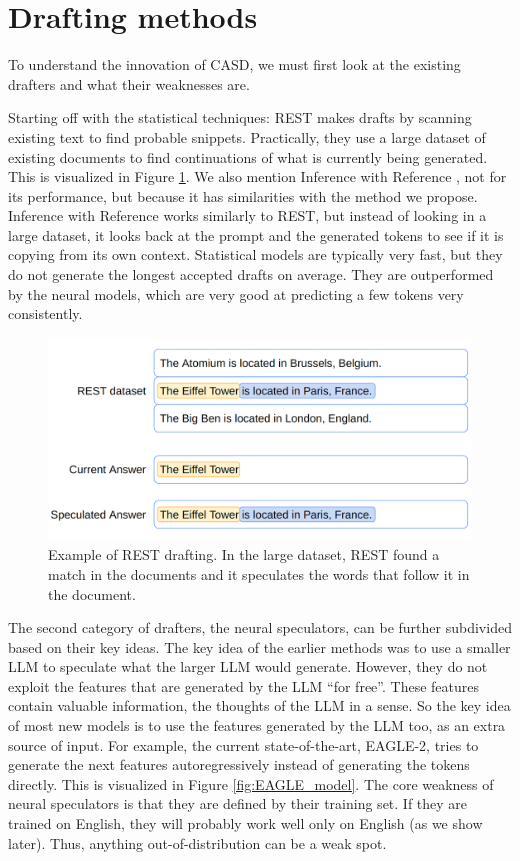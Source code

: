 \section{Drafting methods}
To understand the innovation of CASD, we must first look at the existing drafters and what their weaknesses are.

Starting off with the statistical techniques: REST \cite{he2023rest} makes drafts by scanning existing text to find probable snippets. Practically, they use a large dataset of existing documents to find continuations of what is currently being generated. This is visualized in Figure \ref{fig:spec_dec_rest}. We also mention Inference with Reference \cite{yang2023inference}, not for its performance, but because it has similarities with the method we propose. Inference with Reference works similarly to REST, but instead of looking in a large dataset, it looks back at the prompt and the generated tokens to see if it is copying from its own context. Statistical models are typically very fast, but they do not generate the longest accepted drafts on average. They are outperformed by the neural models, which are very good at predicting a few tokens very consistently. 

\begin{figure}[h]
	\centering
	\includegraphics[width=0.7\linewidth]{fig/spec_dec_rest.png}
	\caption{Example of REST drafting. In the large dataset, REST found a match in the documents and it speculates the words that follow it in the document.}
	\label{fig:spec_dec_rest}
\end{figure}

The second category of drafters, the neural speculators, can be further subdivided based on their key ideas. The key idea of the earlier methods was to use a smaller LLM to speculate what the larger LLM would generate. However, they do not exploit the features that are generated by the LLM ``for free''. These features contain valuable information, the thoughts of the LLM in a sense. So the key idea of most new models is to use the features generated by the LLM too, as an extra source of input. For example, the current state-of-the-art, EAGLE-2, tries to generate the next features autoregressively instead of generating the tokens directly. This is visualized in Figure \ref{fig:EAGLE_model}. The core weakness of neural speculators is that they are defined by their training set. If they are trained on English, they will probably work well only on English (as we show later). Thus, anything out-of-distribution can be a weak spot.

